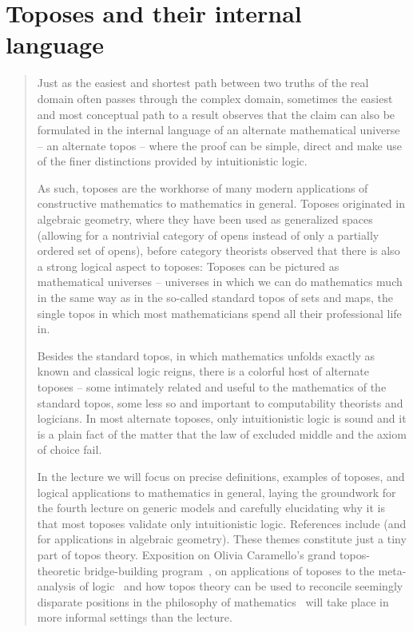 \documentclass[10pt,reqno,a4paper,openany]{amsbook}
\theoremstyle{definition}
\theoremstyle{plain}
\theoremstyle{remark}
\newcommand{\?}{\,{:}\,}
\renewcommand{\_}{\mathpunct{.}\,}
\newenvironment{intro}{\begin{quote}}{\end{quote}\bigskip}
\begin{document}
\chapter{Toposes and their internal language}
\label{lect:toposes}

\begin{intro}
Just as the easiest and shortest path between two truths of the real domain
often passes through the complex domain, sometimes the easiest and most
conceptual path to a result observes that the claim can also be formulated in
the internal language of an alternate mathematical universe -- an alternate
topos -- where the proof can be simple, direct and make use of the finer
distinctions provided by intuitionistic logic.

As such, toposes are the workhorse of many modern applications of constructive
mathematics to mathematics in general. Toposes originated in algebraic
geometry, where they have been used as generalized spaces (allowing for a
nontrivial category of opens instead of only a partially ordered set of opens),
before category theorists observed that there is also a strong logical aspect
to toposes: Toposes can be pictured as mathematical universes -- universes in
which we can do mathematics much in the same way as in the so-called standard
topos of sets and maps, the single topos in which most mathematicians spend all
their professional life in.

Besides the standard topos, in which mathematics unfolds exactly as known and
classical logic reigns, there is a colorful host of alternate toposes -- some
intimately related and useful to the mathematics of the standard topos, some
less so and important to computability theorists and logicians. In most
alternate toposes, only intuitionistic logic is sound and it is a plain fact of
the matter that the law of excluded middle and the axiom of choice fail.

In the lecture we will focus on precise definitions, examples of toposes, and
logical applications to mathematics in general, laying the groundwork for the
fourth lecture on generic models and carefully elucidating why it is that most
toposes validate only intuitionistic logic. References include
\cite{blechschmidt:filmat,leinster:introduction,streicher:ctcl,moerdijk-maclane:sheaves-logic,goldblatt:topoi,johnstone:elephant}
(and \cite{blechschmidt:phd} for applications in algebraic geometry). These
themes constitute just a tiny part of topos theory. Exposition on Olivia
Caramello's grand topos-theoretic bridge-building program~\cite{caramello:tst},
on applications of toposes to the meta-analysis of
logic~\cite{lambek-scott:hocl} and how topos theory can be used to reconcile
seemingly disparate positions in the philosophy of
mathematics~\cite{lambek:incompatible,couture-lambek:reflections} will take
place in more informal settings than the lecture.
\end{intro}
\end{document}
